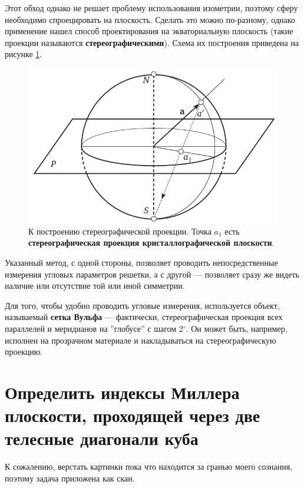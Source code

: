 \documentclass[a4paper, 12pt]{article}
\begin{document}
Этот обход однако не решает проблему использования изометрии, поэтому сферу необходимо спроецировать на плоскость. Сделать это можно по-разному, однако применение нашел способ проектирования на экваториальную плоскость (такие проекции называются \textbf{стереографическими}). Схема их построения приведена на рисунке \ref{fig:stero_ex}. 

\begin{figure}[H]
	\centering
	\includegraphics[width=0.7\linewidth]{Stereo_example}
	\caption{К построению стереографической проекции. Точка $a_1$ есть \textbf{стереографическая проекция кристаллографической плоскости}.}
	\label{fig:stero_ex}
\end{figure}

Указанный метод, с одной стороны, позволяет проводить непосредственные измерения угловых параметров решетки, а с другой --- позволяет сразу же видеть наличие или отсутствие той или иной симметрии.

Для того, чтобы удобно проводить угловые измерения, используется объект, называемый \textbf{сетка Вульфа} --- фактически, стереографическая проекция всех параллелей и меридианов на ''глобусе'' с шагом 2$^\circ$. Он может быть, например, исполнен на прозрачном материале и накладываться на стереографическую проекцию.

\section{Определить индексы Миллера плоскости, проходящей через две телесные диагонали куба}

К сожалению, верстать картинки пока что находится за гранью моего сознания, поэтому задача приложена как скан.
\end{document}
